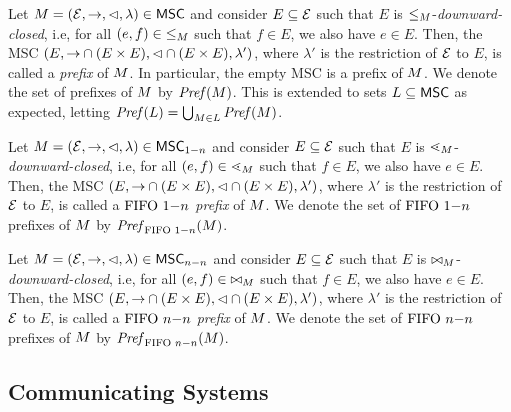 Let $M = (\mathcal{E},\to,\lhd,\lambda) \in \mathsf{MSC}$ and consider
$E \subseteq \mathcal{E}$ such that $E$ is ${\le_M}$-\emph{downward-closed}, i.e,
for all $(e,f) \in {\le_M}$ such that $f \in E$, we also have $e \in E$.
Then, the MSC $(E,{\to} \cap (E \times E),{\lhd} \cap (E \times E),\lambda')$,
where $\lambda'$ is the restriction of $\mathcal{E}$ to $E$, is called a \emph{prefix}
of $M$. In particular, the empty MSC is a prefix of $M$.
We denote the set of prefixes of $M$ by $\mathit{Pref}(M)$.
This is extended to sets $L \subseteq \mathsf{MSC}$ as expected, letting
$\mathit{Pref}(L) = \bigcup_{M \in L} \mathit{Pref}(M)$.

\smallskip

Let $M = (\mathcal{E},\to,\lhd,\lambda) \in \mathsf{MSC}_{1\mathsf{-}n}$ and consider
$E \subseteq \mathcal{E}$ such that $E$ is ${\lessdot_M}$-\emph{downward-closed}, i.e,
for all $(e,f) \in {\lessdot_M}$ such that $f \in E$, we also have $e \in E$.
Then, the MSC $(E,{\to} \cap (E \times E),{\lhd} \cap (E \times E),\lambda')$,
where $\lambda'$ is the restriction of $\mathcal{E}$ to $E$, is called a \emph{$\text{FIFO } 1\mathsf{-}n$ prefix} of $M$. We denote the set of $\text{FIFO } 1\mathsf{-}n$ prefixes of $M$ by $\mathit{Pref}_{\text{FIFO } 1\mathsf{-}n}(M)$.

\smallskip

Let $M = (\mathcal{E},\to,\lhd,\lambda) \in \mathsf{MSC}_{n\mathsf{-}n}$ and consider
$E \subseteq \mathcal{E}$ such that $E$ is ${\bowtie_M}$-\emph{downward-closed}, i.e,
for all $(e,f) \in {\bowtie_M}$ such that $f \in E$, we also have $e \in E$.
Then, the MSC $(E,{\to} \cap (E \times E),{\lhd} \cap (E \times E),\lambda')$,
where $\lambda'$ is the restriction of $\mathcal{E}$ to $E$, is called a \emph{$\text{FIFO } n\mathsf{-}n$ prefix} of $M$. We denote the set of $\text{FIFO } n\mathsf{-}n$ prefixes of $M$ by $\mathit{Pref}_{\text{FIFO } n\mathsf{-}n}(M)$.

\subsection{Communicating Systems}

